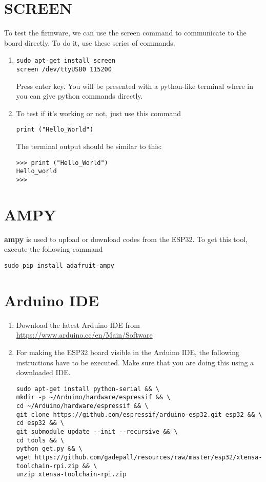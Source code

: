 \documentclass[journal,12pt,twocolumn]{IEEEtran}
\begin{document}
\section{SCREEN}
To test the firmware, we can use the screen command to communicate to the board directly. To do it, use these series of commands.
\begin{enumerate}
\item

\begin{lstlisting}
sudo apt-get install screen
screen /dev/ttyUSB0 115200
\end{lstlisting}
Press enter key. You will be presented with a python-like terminal where in you can give python commands directly.
\item
To test if it's working or not, just use this command

\begin{lstlisting}
print ("Hello_World")
\end{lstlisting}
The terminal output should be similar to this:
\begin{lstlisting}
>>> print ("Hello_World")
Hello_world
>>>
\end{lstlisting}
\end{enumerate}
%
\section{AMPY}
\textbf{ampy} is used to upload or download codes from the ESP32.
To get this tool, execute the following command
\begin{lstlisting}
sudo pip install adafruit-ampy 
\end{lstlisting} 
\section{Arduino IDE}
\begin{enumerate}
\item Download the latest Arduino IDE from \href{https://www.arduino.cc/en/Main/Software}{https://www.arduino.cc/en/Main/Software}
\item For making the ESP32 board visible in the Arduino IDE, the following instructions have to be executed.  Make sure that you are doing this using a downloaded IDE.
\begin{lstlisting}
sudo apt-get install python-serial && \
mkdir -p ~/Arduino/hardware/espressif && \
cd ~/Arduino/hardware/espressif && \
git clone https://github.com/espressif/arduino-esp32.git esp32 && \
cd esp32 && \
git submodule update --init --recursive && \
cd tools && \
python get.py && \
wget https://github.com/gadepall/resources/raw/master/esp32/xtensa-toolchain-rpi.zip && \
unzip xtensa-toolchain-rpi.zip
\end{lstlisting}


\end{enumerate}
\end{document}
